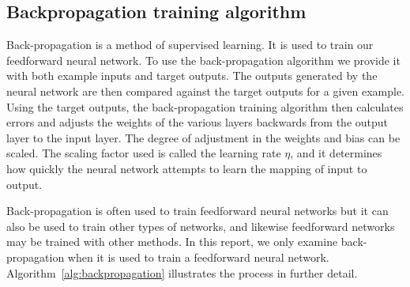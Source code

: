 \documentclass[11pt]{article}
\begin{document}

\subsection{Backpropagation training algorithm} %
\label{sub:backpropagation_training_algorithm}

Back-propagation is a method of supervised learning. It is used to train our feedforward neural network. To use the back-propagation
algorithm we provide it with both example inputs and target outputs. The outputs generated by the neural network are then compared
against the target outputs for a given example. Using the target outputs, the back-propagation training algorithm then calculates
errors and adjusts the weights of the various layers backwards from the output layer to the input layer. The degree of adjustment in the
weights and bias can be scaled. The scaling factor used is called the learning rate $\eta$, and it determines how quickly the neural
network attempts to learn the mapping of input to output.

Back-propagation is often used to train feedforward neural networks but it can also be used to train other types of networks, and
likewise feedforward networks may be trained with other methods. In this report, we only examine back-propagation when it is used to
train a feedforward neural network. Algorithm~\ref{alg:backpropagation} illustrates the process in further detail.
\end{document}
